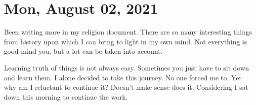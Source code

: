 \section{Mon, August 02, 2021}

Been writing more in my religion document. There are so many interesting things
from history upon which I can bring to light in my own mind. Not everything is
good mind you, but a lot can be taken into account.

Learning truth of things is not always easy. Sometimes you just have to sit down
and learn them. I alone decided to take this journey. No one forced me to. Yet
why am I reluctant to continue it? Doesn't make sense does it. Considering I
sat down this morning to continue the work.